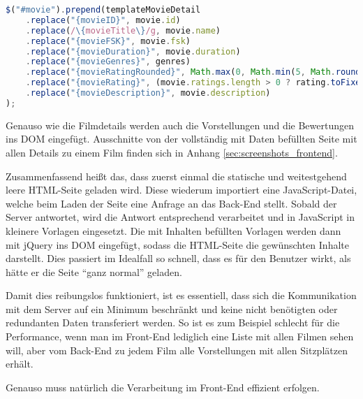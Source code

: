 \begin{lstlisting}[language=JavaScript, caption={Einfügen der Filmdetails ins \acs{DOM} mit jQuery}, label={lst:js_write_movie_detail_to_dom}]
$("#movie").prepend(templateMovieDetail
	.replace("{movieID}", movie.id)
	.replace(/\{movieTitle\}/g, movie.name)
	.replace("{movieFSK}", movie.fsk)
	.replace("{movieDuration}", movie.duration)
	.replace("{movieGenres}", genres)
	.replace("{movieRatingRounded}", Math.max(0, Math.min(5, Math.round(rating))))
	.replace("{movieRating}", (movie.ratings.length > 0 ? rating.toFixed(1).replace(".",",") : "") + " (" + movie.ratings.length + " Bewertung" + (movie.ratings.length == 1 ? "" : "en") + ")")
	.replace("{movieDescription}", movie.description)
);
\end{lstlisting}

Genauso wie die Filmdetails werden auch die Vorstellungen und die Bewertungen ins \acs{DOM} eingefügt.
Ausschnitte von der vollständig mit Daten befüllten Seite mit allen Details zu einem Film finden sich in Anhang \vref{sec:screenshots_frontend}.

Zusammenfassend heißt das, dass zuerst einmal die statische und weitestgehend leere \acs{HTML}-Seite geladen wird.
Diese wiederum importiert eine JavaScript-Datei, welche beim Laden der Seite eine Anfrage an das Back-End stellt.
Sobald der Server antwortet, wird die Antwort entsprechend verarbeitet und in JavaScript in kleinere Vorlagen eingesetzt.
Die mit Inhalten befüllten Vorlagen werden dann mit jQuery ins \acs{DOM} eingefügt, sodass die \acs{HTML}-Seite die gewünschten Inhalte darstellt.
Dies passiert im Idealfall so schnell, dass es für den Benutzer wirkt, als hätte er die Seite \enquote{ganz normal} geladen.

Damit dies reibungslos funktioniert, ist es essentiell, dass sich die Kommunikation mit dem Server auf ein Minimum beschränkt und keine nicht benötigten oder redundanten Daten transferiert werden.
So ist es zum Beispiel schlecht für die Performance, wenn man im Front-End lediglich eine Liste mit allen Filmen sehen will, aber vom Back-End zu jedem Film alle Vorstellungen mit allen Sitzplätzen erhält.

Genauso muss natürlich die Verarbeitung im Front-End effizient erfolgen.